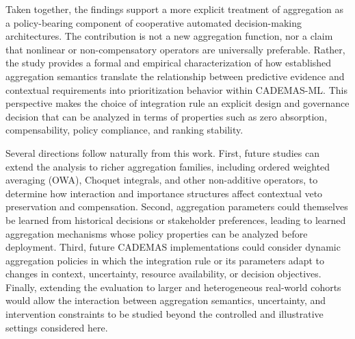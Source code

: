 \documentclass[mathematics,article,submit,moreauthors]{Definitions/mdpi}
\begin{document}
Taken together, the findings support a more explicit treatment of
aggregation as a policy-bearing component of cooperative automated
decision-making architectures. The contribution is not a new aggregation
function, nor a claim that nonlinear or non-compensatory operators are
universally preferable. Rather, the study provides a formal and empirical
characterization of how established aggregation semantics translate the
relationship between predictive evidence and contextual requirements into
prioritization behavior within CADEMAS-ML. This perspective makes the
choice of integration rule an explicit design and governance decision that
can be analyzed in terms of properties such as zero absorption,
compensability, policy compliance, and ranking stability.

Several directions follow naturally from this work. First, future studies
can extend the analysis to richer aggregation families, including ordered
weighted averaging (OWA), Choquet integrals, and other non-additive
operators, to determine how interaction and importance structures affect
contextual veto preservation and compensation. Second, aggregation
parameters could themselves be learned from historical decisions or
stakeholder preferences, leading to learned aggregation mechanisms whose
policy properties can be analyzed before deployment. Third, future CADEMAS
implementations could consider dynamic aggregation policies in which the
integration rule or its parameters adapt to changes in context, uncertainty,
resource availability, or decision objectives. Finally, extending the
evaluation to larger and heterogeneous real-world cohorts would allow the
interaction between aggregation semantics, uncertainty, and intervention
constraints to be studied beyond the controlled and illustrative settings
considered here.






\end{document}
